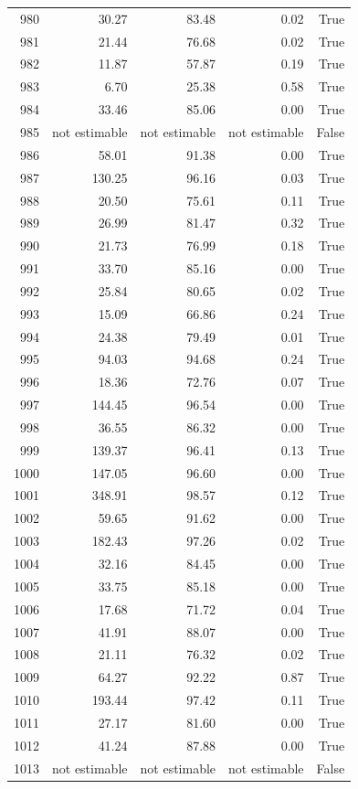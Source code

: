 \begin{longtable}{rrrrr}
980 & 30.27 & 83.48 & 0.02 & True \\
981 & 21.44 & 76.68 & 0.02 & True \\
982 & 11.87 & 57.87 & 0.19 & True \\
983 & 6.70 & 25.38 & 0.58 & True \\
984 & 33.46 & 85.06 & 0.00 & True \\
985 & not estimable & not estimable & not estimable & False \\
986 & 58.01 & 91.38 & 0.00 & True \\
987 & 130.25 & 96.16 & 0.03 & True \\
988 & 20.50 & 75.61 & 0.11 & True \\
989 & 26.99 & 81.47 & 0.32 & True \\
990 & 21.73 & 76.99 & 0.18 & True \\
991 & 33.70 & 85.16 & 0.00 & True \\
992 & 25.84 & 80.65 & 0.02 & True \\
993 & 15.09 & 66.86 & 0.24 & True \\
994 & 24.38 & 79.49 & 0.01 & True \\
995 & 94.03 & 94.68 & 0.24 & True \\
996 & 18.36 & 72.76 & 0.07 & True \\
997 & 144.45 & 96.54 & 0.00 & True \\
998 & 36.55 & 86.32 & 0.00 & True \\
999 & 139.37 & 96.41 & 0.13 & True \\
1000 & 147.05 & 96.60 & 0.00 & True \\
1001 & 348.91 & 98.57 & 0.12 & True \\
1002 & 59.65 & 91.62 & 0.00 & True \\
1003 & 182.43 & 97.26 & 0.02 & True \\
1004 & 32.16 & 84.45 & 0.00 & True \\
1005 & 33.75 & 85.18 & 0.00 & True \\
1006 & 17.68 & 71.72 & 0.04 & True \\
1007 & 41.91 & 88.07 & 0.00 & True \\
1008 & 21.11 & 76.32 & 0.02 & True \\
1009 & 64.27 & 92.22 & 0.87 & True \\
1010 & 193.44 & 97.42 & 0.11 & True \\
1011 & 27.17 & 81.60 & 0.00 & True \\
1012 & 41.24 & 87.88 & 0.00 & True \\
1013 & not estimable & not estimable & not estimable & False \\

\end{longtable}
